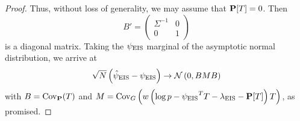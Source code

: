 \begin{proof}
    Thus, without loss of generality, we may assume that $\P[T] = 0$. 
    Then 
    $$
        B' = \begin{pmatrix}
            \Sigma^{-1} & 0 \\
            0 & 1
        \end{pmatrix}
    $$
    is a diagonal matrix. Taking the $\peis$ marginal of the asymptotic normal distribution, we arrive at 
    $$
        \sqrt{N} \left( \hpeis - \peis \right) \to \mathcal N \left( 0, BMB \right)
    $$
    with $B = \cov_{\P}(T)$ and $M = \cov_{G} \left( w \left( \log p - \peis^{T}T - \lambda_{\eis} - \P[T] \right)T \right)$, as promised.
    
\end{proof}

